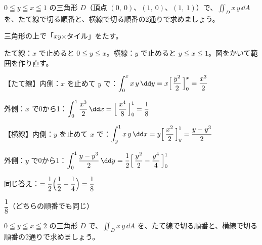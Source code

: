 \begin{reidai}[積分の順番を変える]
$0\leqq y\leqq x\leqq1$ の三角形 $D$（頂点 $(0,\ 0)$、$(1,\ 0)$、$(1,\ 1)$）で、$\iint_D x\,y\,\dd A$ を、たて線で切る順番と、横線で切る順番の2通りで求めましょう。\par
\kangaekata {}\par
{}\enspace 三角形の上で「$xy$×タイル」をたす。\par
{}\enspace たて線：$x$ で止めると $0\leqq y\leqq x$。横線：$y$ で止めると $y\leqq x\leqq1$。図をかいて範囲を作り直す。\par
\shiki\kviiigs{}\zw{} 【たて線】内側：$x$ を止めて $y$ で：$\displaystyle \int_0^x x\,y\,\dd y=x\Bigl[\,\dfrac{y^2}{2}\,\Bigr]_0^x=\dfrac{x^3}{2}$\par
\kviiiga 外側：$x$ で0から1：$\displaystyle \int_0^1\dfrac{x^3}{2}\,\dd x=\Bigl[\,\dfrac{x^4}{8}\,\Bigr]_0^1=\dfrac{1}{8}$\par
\kviiiga 【横線】内側：$y$ を止めて $x$ で：$\displaystyle \int_y^1 x\,y\,\dd x=y\Bigl[\,\dfrac{x^2}{2}\,\Bigr]_y^1=\dfrac{y-y^3}{2}$\par
\kviiiga 外側：$y$ で0から1：$\displaystyle \int_0^1\dfrac{y-y^3}{2}\,\dd y=\dfrac{1}{2}\Bigl[\,\dfrac{y^2}{2}-\dfrac{y^4}{4}\,\Bigr]_0^1$\par
\kviiiga 同じ答え：$\displaystyle =\dfrac{1}{2}\Bigl(\dfrac{1}{2}-\dfrac{1}{4}\Bigr)=\dfrac{1}{8}$\par
\kotae $\dfrac{1}{8}$（どちらの順番でも同じ）
\end{reidai}

\begin{jibun}
$0\leqq y\leqq x\leqq2$ の三角形 $D$ で、$\iint_D x\,y\,\dd A$ を、たて線で切る順番と、横線で切る順番の2通りで求めましょう。
\end{jibun}

